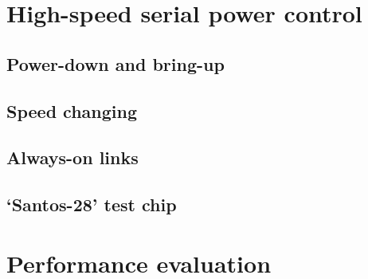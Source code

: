 	\section{High-speed serial power control}
		
		
		\subsection{Power-down and bring-up}
			
		
		\subsection{Speed changing}
			
		
		\subsection{Always-on links}
			
		
		\subsection{`Santos-28' test chip}
			
	
	
	\section{Performance evaluation}
		

